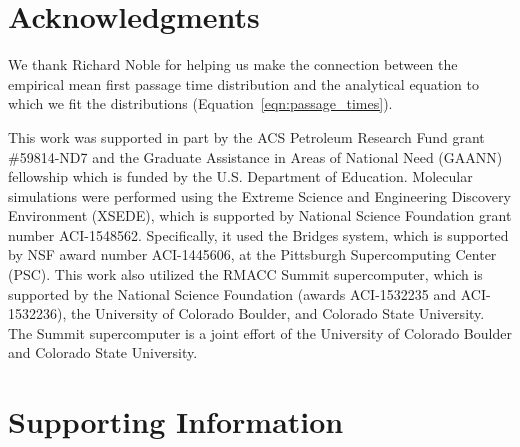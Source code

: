 \documentclass[journal=ancac3,manuscript=article,layout=twocolumn]{achemso}
\begin{document}
  \section*{Acknowledgments}
  
  We thank Richard Noble for helping us make the connection between the empirical 
  mean first passage time distribution and the analytical equation to which we fit
  the distributions (Equation~\ref{eqn:passage_times}).
  
  This work was supported in part by the ACS Petroleum Research Fund grant
  \#59814-ND7 and the Graduate Assistance in Areas of National Need (GAANN)
  fellowship which is funded by the U.S. Department of Education.  Molecular
  simulations were performed using the Extreme Science and Engineering
  Discovery Environment (XSEDE), which is supported by National Science
  Foundation grant number ACI-1548562. Specifically, it used the Bridges
  system, which is supported by NSF award number ACI-1445606, at the Pittsburgh
  Supercomputing Center (PSC). This work also utilized the RMACC Summit
  supercomputer, which is supported by the National Science Foundation (awards
  ACI-1532235 and ACI-1532236), the University of Colorado Boulder, and
  Colorado State University. The Summit supercomputer is a joint effort of the
  University of Colorado Boulder and Colorado State University.
  
  \section*{Supporting Information}
  
  
 
  \clearpage
  

%    
\end{document}
